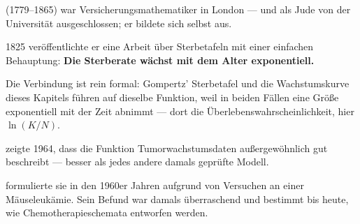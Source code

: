 \begin{geschichte}
 (1779--1865) war Versicherungsmathematiker in London --- und als Jude von der Universität ausgeschlossen; er bildete sich selbst aus.

1825 veröffentlichte er eine Arbeit über Sterbetafeln mit einer einfachen Behauptung: \textbf{Die Sterberate wächst mit dem Alter exponentiell.}

\begin{center}
\begin{minipage}{0.9\textwidth}
\end{minipage}
\end{center}

Die Verbindung ist rein formal: Gompertz' Sterbetafel und die Wachstumskurve dieses Kapitels führen auf dieselbe Funktion, weil in beiden Fällen eine Größe exponentiell mit der Zeit abnimmt --- dort die Überlebenswahrscheinlichkeit, hier $\ln(K/N)$.

 zeigte 1964, dass die Funktion Tumorwachstumsdaten außergewöhnlich gut beschreibt --- besser als jedes andere damals geprüfte Modell.

\begin{center}
\begin{minipage}{0.9\textwidth}
\end{minipage}
\end{center}

 formulierte sie in den 1960er Jahren aufgrund von Versuchen an einer Mäuseleukämie. Sein Befund war damals überraschend und bestimmt bis heute, wie Chemotherapieschemata entworfen werden.

\begin{center}
\begin{minipage}{0.9\textwidth}
\end{minipage}
\end{center}
\end{geschichte}

